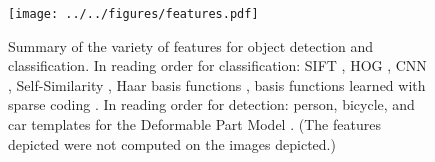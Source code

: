 \begin{figure}[ht]
\centering
\texttt{[image: ../../figures/features.pdf]}
\caption[Summary of the variety of features for object detection and classification.]{
Summary of the variety of features for object detection and classification.
In reading order for classification: SIFT \parencite{Lowe2004}, HOG \parencite{Dalal2005}, CNN \parencite{Krizhevsky-NIPS-2012}, Self-Similarity \parencite{Shechtman2007}, Haar basis functions \parencite{Viola-IJCV-2004}, basis functions learned with sparse coding \parencite{Olshausen1996}.
In reading order for detection: person, bicycle, and car templates for the Deformable Part Model \parencite{Felzenszwalb2010a}.
(The features depicted were not computed on the images depicted.)
}\label{fig:features}
\end{figure}
